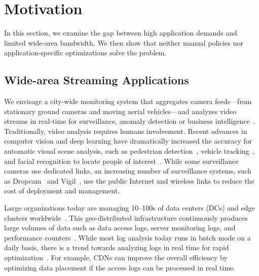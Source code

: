\section{Motivation}
\label{sec:motivation}

In this section, we examine the gap between high application demands and limited
wide-area bandwidth. We then show that neither manual policies nor
application-specific optimizations solve the problem.

\subsection{Wide-area Streaming Applications}
\label{sec:wide-area-streaming}

 We envisage a city-wide monitoring system that
aggregates camera feeds---from stationary ground cameras and moving aerial
vehicles---and analyzes video streams in real-time for surveillance, anomaly
detection or business intelligence~\cite{oh2011large}. Traditionally, video
analysis requires humans involvement. Recent advances in computer vision and
deep learning have dramatically increased the accuracy for automatic visual
scene analysis, such as pedestrian detection~\cite{dollar2012pedestrian},
vehicle tracking~\cite{coifman1998real}, and facial recognition to locate people
of interest~\cite{parkhi2015deep, Lu:2015:SHF:2888116.2888245}. While some
surveillance cameras use dedicated links, an increasing number of surveillance
systems, such as Dropcam~\cite{dropcam} and Vigil~\cite{zhang2015design}, use
the public Internet and wireless links to reduce the cost of deployment and
management.


 Large organizations today are managing
10--100s of data centers (DCs) and edge clusters
worldwide~\cite{calder2013mapping}. This geo-distributed infrastructure
continuously produces large volumes of data such as data access logs, server
monitoring logs, and performance counters~\cite{pu2015low,
  alspaugh2014analyzing, vulimiri2015global}. While most log analysis today runs
in batch mode on a daily basis, there is a trend towards analyzing logs in real
time for rapid optimization~\cite{rabkin2014aggregation}. For example, CDNs can
improve the overall efficiency by optimizing data placement if the access logs
can be processed in real time.


